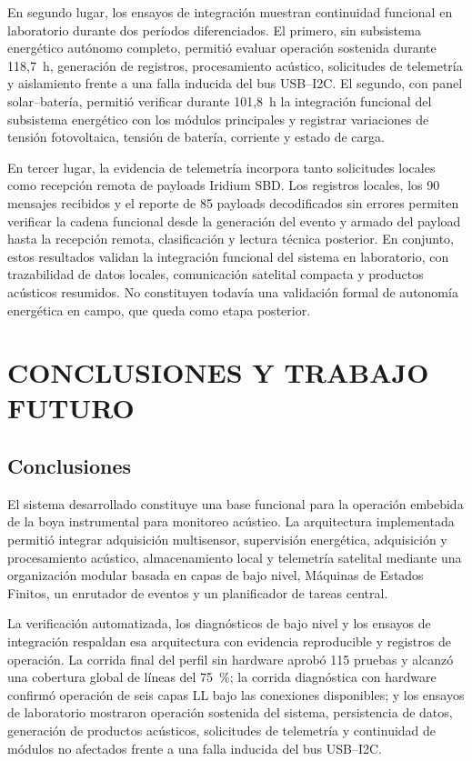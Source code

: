 En segundo lugar, los ensayos de integración muestran continuidad funcional en laboratorio durante dos períodos diferenciados. El primero, sin subsistema energético autónomo completo, permitió evaluar operación sostenida durante 118,7~h, generación de registros, procesamiento acústico, solicitudes de telemetría y aislamiento frente a una falla inducida del bus USB--I2C. El segundo, con panel solar--batería, permitió verificar durante 101,8~h la integración funcional del subsistema energético con los módulos principales y registrar variaciones de tensión fotovoltaica, tensión de batería, corriente y estado de carga.

En tercer lugar, la evidencia de telemetría incorpora tanto solicitudes locales como recepción remota de payloads Iridium SBD. Los registros locales, los 90 mensajes recibidos y el reporte de 85 payloads decodificados sin errores permiten verificar la cadena funcional desde la generación del evento y armado del payload hasta la recepción remota, clasificación y lectura técnica posterior. En conjunto, estos resultados validan la integración funcional del sistema en laboratorio, con trazabilidad de datos locales, comunicación satelital compacta y productos acústicos resumidos. No constituyen todavía una validación formal de autonomía energética en campo, que queda como etapa posterior.


\clearpage
\section{CONCLUSIONES Y TRABAJO FUTURO}
\label{sec:conclusiones_trabajo_futuro}

\subsection{Conclusiones}

El sistema desarrollado constituye una base funcional para la operación embebida de la boya instrumental para monitoreo acústico. La arquitectura implementada permitió integrar adquisición multisensor, supervisión energética, adquisición y procesamiento acústico, almacenamiento local y telemetría satelital mediante una organización modular basada en capas de bajo nivel, Máquinas de Estados Finitos, un enrutador de eventos y un planificador de tareas central.

La verificación automatizada, los diagnósticos de bajo nivel y los ensayos de integración respaldan esa arquitectura con evidencia reproducible y registros de operación. La corrida final del perfil sin hardware aprobó 115 pruebas y alcanzó una cobertura global de líneas del 75~\%; la corrida diagnóstica con hardware confirmó operación de seis capas LL bajo las conexiones disponibles; y los ensayos de laboratorio mostraron operación sostenida del sistema, persistencia de datos, generación de productos acústicos, solicitudes de telemetría y continuidad de módulos no afectados frente a una falla inducida del bus USB--I2C.

